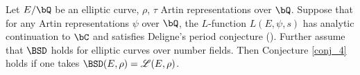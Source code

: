 \begin{thm}\cite[Corollary 25]{DEW1}
   Let $E / \bQ$ be an elliptic curve, $\rho$, $\tau$ Artin representations over $\bQ$. Suppose that for any Artin representations $\psi$ over $\bQ$, the $L$-function $L(E, \psi, s)$ has analytic continuation to $\bC$ and satisfies Deligne's period conjecture (\cite{Deligne}). Further assume that $\BSD$ holds for elliptic curves over number fields. Then Conjecture \ref{conj_4} holds if one takes $\BSD(E, \rho) = \mathcal{L}(E, \rho)$. 
\end{thm}



